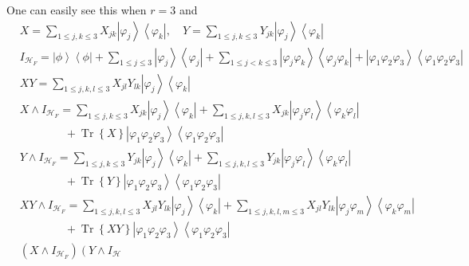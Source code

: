 \documentclass[aps,preprint]{revtex4}%
\begin{document}
One can easily see this when $r=3$ and
\begin{align}
&  X=\sum_{1\leq j,k\leq3}X_{jk}\left\vert \varphi_{j}\right\rangle
\left\langle \varphi_{k}\right\vert ,\quad Y=\sum_{1\leq j,k\leq3}%
Y_{jk}\left\vert \varphi_{j}\right\rangle \left\langle \varphi_{k}\right\vert
\nonumber\\
&  I_{\mathcal{H}_{F}}=\left\vert \phi\right\rangle \left\langle
\phi\right\vert +\sum_{1\leq j\leq3}\left\vert \varphi_{j}\right\rangle
\left\langle \varphi_{j}\right\vert +\sum_{1\leq j<k\leq3}\left\vert
\varphi_{j}\varphi_{k}\right\rangle \left\langle \varphi_{j}\varphi
_{k}\right\vert +\left\vert \varphi_{1}\varphi_{2}\varphi_{3}\right\rangle
\left\langle \varphi_{1}\varphi_{2}\varphi_{3}\right\vert \nonumber\\
&  XY=\sum_{1\leq j,k,l\leq3}X_{jl}Y_{lk}\left\vert \varphi_{j}\right\rangle
\left\langle \varphi_{k}\right\vert \quad\nonumber\\
&  X\wedge I_{\mathcal{H}_{F}}=\sum_{1\leq j,k\leq3}X_{jk}\left\vert
\varphi_{j}\right\rangle \left\langle \varphi_{k}\right\vert +\sum_{1\leq
j,k,l\leq3}X_{jk}\left\vert \varphi_{j}\varphi_{l}\right\rangle \left\langle
\varphi_{k}\varphi_{l}\right\vert \nonumber\\
&  \qquad\qquad+\operatorname*{Tr}\left\{  X\right\}  \left\vert \varphi
_{1}\varphi_{2}\varphi_{3}\right\rangle \left\langle \varphi_{1}\varphi
_{2}\varphi_{3}\right\vert \nonumber\\
&  Y\wedge I_{\mathcal{H}_{F}}=\sum_{1\leq j,k\leq3}Y_{jk}\left\vert
\varphi_{j}\right\rangle \left\langle \varphi_{k}\right\vert +\sum_{1\leq
j,k,l\leq3}Y_{jk}\left\vert \varphi_{j}\varphi_{l}\right\rangle \left\langle
\varphi_{k}\varphi_{l}\right\vert \nonumber\\
&  \qquad\qquad+\operatorname*{Tr}\left\{  Y\right\}  \left\vert \varphi
_{1}\varphi_{2}\varphi_{3}\right\rangle \left\langle \varphi_{1}\varphi
_{2}\varphi_{3}\right\vert \nonumber\\
&  XY\wedge I_{\mathcal{H}_{F}}=\sum_{1\leq j,k,l\leq3}X_{jl}Y_{lk}\left\vert
\varphi_{j}\right\rangle \left\langle \varphi_{k}\right\vert +\sum_{1\leq
j,k,l,m\leq3}X_{jl}Y_{lk}\left\vert \varphi_{j}\varphi_{m}\right\rangle
\left\langle \varphi_{k}\varphi_{m}\right\vert \nonumber\\
&  \qquad\qquad+\operatorname*{Tr}\left\{  XY\right\}  \left\vert \varphi
_{1}\varphi_{2}\varphi_{3}\right\rangle \left\langle \varphi_{1}\varphi
_{2}\varphi_{3}\right\vert \nonumber\\
&  \left(  X\wedge I_{\mathcal{H}_{F}}\right)  \left(  Y\wedge I_{\mathcal{H}%
}
\end{align}
\end{document}
